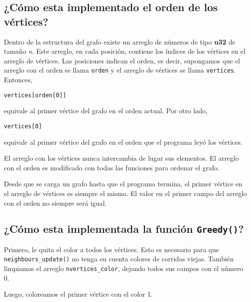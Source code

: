 \documentclass[11pt]{article}   	%
\begin{document}
\lstset{style=customC}
\subsection{¿Cómo esta implementado el orden de los vértices?}
Dentro de la estructura del grafo existe un arreglo de números de tipo \textbf{u32} de tamaño \emph{n}.
Este arreglo, en cada posición, contiene los índices de los vértices en el arreglo de vértices.
Las posiciones indican el orden, es decir, supongamos que el arreglo con el orden se llama \texttt{orden}
y el arreglo de vértices se llama \texttt{vertices}. Entonces,
\begin{lstlisting}
vertices[orden[0]]
\end{lstlisting}
equivale al primer vértice del grafo en el orden actual. Por otro lado,
\begin{lstlisting}
vertices[0]
\end{lstlisting}
equivale al primer vértice del grafo en el orden que el programa leyó los vértices.

El arreglo con los vértices nunca intercambia de lugar sus elementos. El arreglo con el orden es modificado
con todas las funciones para ordenar el grafo.

Desde que se carga un grafo hasta que el programa termina, el primer vértice en el arreglo de vértices es
siempre el mismo. El valor en el primer campo del arreglo con el orden no siempre será igual.

\subsection{¿Cómo esta implementada la función \texttt{Greedy()}?}
Primero, le quita el color a todos los vértices. Esto es necesario para que \texttt{neighbours\_update()}
no tenga en cuenta colores de corridas viejas. También limpiamos el arreglo \texttt{nvertices\_color},
dejando todos sus campos con el número 0.

Luego, coloreamos el primer vértice con el color 1.
\end{document}
